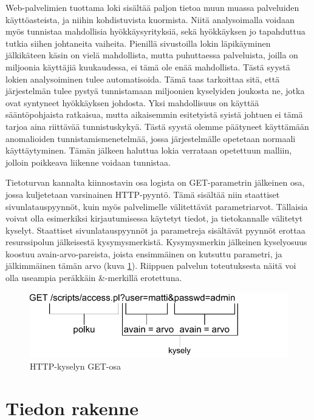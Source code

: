 Web-palvelimien tuottama loki sisältää paljon tietoa muun muassa palveluiden käyttöasteista, ja niihin kohdistuvista kuormista. Niitä analysoimalla voidaan myös tunnistaa mahdollisia hyökkäysyrityksiä, sekä
hyökkäyksen jo tapahduttua tutkia siihen johtaneita vaiheita. Pienillä sivustoilla lokin läpikäyminen jälkikäteen käsin on vielä mahdollista, mutta puhuttaessa palveluista, joilla on miljoonia käyttäjiä 
kuukaudessa, ei tämä ole enää mahdollista. Tästä syystä lokien analysoiminen tulee automatisoida. Tämä taas tarkoittaa sitä, että järjestelmän tulee pystyä tunnistamaan miljoonien kyselyiden joukosta
ne, jotka ovat syntyneet hyökkäyksen johdosta. Yksi mahdollisuus on käyttää sääntöpohjaista ratkaisua, mutta aikaisemmin esitetyistä syistä johtuen ei tämä tarjoa aina riittävää tunnistuskykyä. Tästä 
syystä olemme päätyneet käyttämään anomalioiden tunnistamismenetelmää, jossa järjestelmälle opetetaan normaali käyttäytyminen. Tämän jälkeen haluttua lokia verrataan opetettuun malliin, jolloin poikkeava
liikenne voidaan tunnistaa.

Tietoturvan kannalta kiinnostavin osa logista on GET-parametrin jälkeinen osa, jossa kuljetetaan varsinainen HTTP-pyyntö. Tämä sisältää niin staattiset sivunlatauspyynnöt, kuin myös palvelimelle 
välitettävät parametriarvot. Tällaisia voivat olla esimerkiksi kirjautumisessa käytetyt tiedot, ja tietokannalle välitetyt kyselyt. Staattiset sivunlatauspyynnöt ja parametreja sisältävät pyynnöt erottaa
resurssipolun jälkeisestä kysymysmerkistä. Kysymysmerkin jälkeinen kyselyosuus koostuu avain-arvo-pareista, joista ensimmäinen on kutsuttu parametri, ja jälkimmäinen tämän arvo (kuva \ref{CLF2}). Riippuen
palvelun toteutuksesta näitä voi olla useampia peräkkäin \&-merkillä erotettuna.

\begin{figure}[ht]
\centering
\includegraphics[width=13cm]{pics/logi2.pdf}
\caption{HTTP-kyselyn GET-osa}
\label{CLF2}
\end{figure}


\section{Tiedon rakenne}

